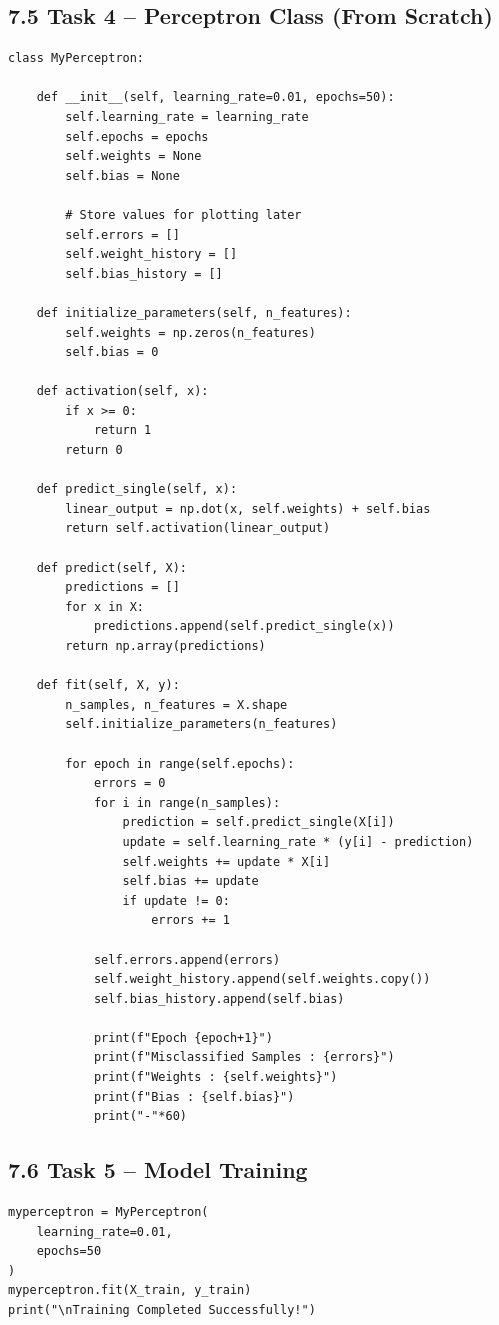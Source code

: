 \documentclass[11pt]{article}
\begin{document}
\subsection*{7.5 Task 4 -- Perceptron Class (From Scratch)}
\begin{lstlisting}
class MyPerceptron:

    def __init__(self, learning_rate=0.01, epochs=50):
        self.learning_rate = learning_rate
        self.epochs = epochs
        self.weights = None
        self.bias = None

        # Store values for plotting later
        self.errors = []
        self.weight_history = []
        self.bias_history = []

    def initialize_parameters(self, n_features):
        self.weights = np.zeros(n_features)
        self.bias = 0

    def activation(self, x):
        if x >= 0:
            return 1
        return 0

    def predict_single(self, x):
        linear_output = np.dot(x, self.weights) + self.bias
        return self.activation(linear_output)

    def predict(self, X):
        predictions = []
        for x in X:
            predictions.append(self.predict_single(x))
        return np.array(predictions)

    def fit(self, X, y):
        n_samples, n_features = X.shape
        self.initialize_parameters(n_features)

        for epoch in range(self.epochs):
            errors = 0
            for i in range(n_samples):
                prediction = self.predict_single(X[i])
                update = self.learning_rate * (y[i] - prediction)
                self.weights += update * X[i]
                self.bias += update
                if update != 0:
                    errors += 1

            self.errors.append(errors)
            self.weight_history.append(self.weights.copy())
            self.bias_history.append(self.bias)

            print(f"Epoch {epoch+1}")
            print(f"Misclassified Samples : {errors}")
            print(f"Weights : {self.weights}")
            print(f"Bias : {self.bias}")
            print("-"*60)
\end{lstlisting}

\subsection*{7.6 Task 5 -- Model Training}
\begin{lstlisting}
myperceptron = MyPerceptron(
    learning_rate=0.01,
    epochs=50
)
myperceptron.fit(X_train, y_train)
print("\nTraining Completed Successfully!")
\end{lstlisting}
\end{document}
